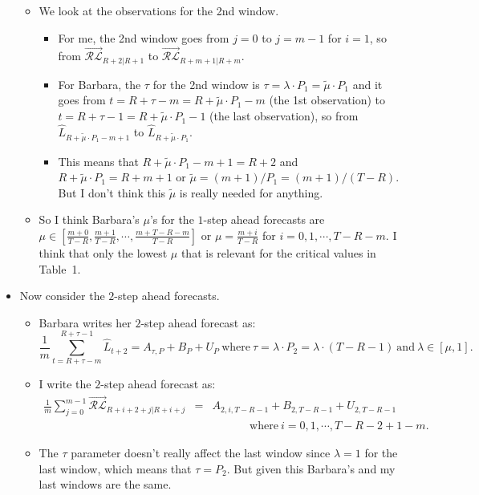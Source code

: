 \documentclass[11pt]{article}
\begin{document}
\begin{itemize}
\begin{itemize}
\item We look at the observations for the 2nd window. 
\begin{itemize}
\item For me, the 2nd window goes from $j=0$ to $j=m-1$ for $i=1$, so from
$\overrightarrow{\mathcal{RL}}_{R+2|R+1}$ to $\overrightarrow{\mathcal{RL}}_{R+m+1|R+m}$.
\item For Barbara, the $\tau$ for the 2nd window is $\tau=\lambda\cdot P_{1}=\widetilde{\mu}\cdot P_{1}$ and it goes from $t=R+\tau-m=R+\widetilde{\mu}\cdot P_{1}-m$ (the 1st observation) to $t=R+\tau-1=R+\widetilde{\mu}\cdot P_{1}-1$ (the last observation), so from $\widehat{L}_{R+\widetilde{\mu}\cdot P_{1}-m+1}$ to $\widehat{L}_{R+\widetilde{\mu}\cdot P_{1}}$.
\item This means that $R+\widetilde{\mu}\cdot P_{1}-m+1=R+2$ and $R+\widetilde{\mu}\cdot P_{1}=R+m+1$ or $\widetilde{\mu}=(m+1)/P_{1}=(m+1)/(T-R)$.  But I don't think this $\widetilde{\mu}$ is really needed for anything.
\end{itemize}
\item So I think Barbara's $\mu$'s for the $1$-step ahead forecasts are $\mu\in [\frac{m+0}{T-R},\frac{m+1}{T-R},\cdots,\frac{m+T-R-m}{T-R}]$ or $\mu=\frac{m+i}{T-R}$ for $i=0,1,\cdots,T-R-m$.  I think that only
the lowest $\mu$ that is relevant for the critical values in Table~1.
\end{itemize}
\item Now consider the $2$-step ahead forecasts.
\begin{itemize}
\item Barbara writes her $2$-step ahead forecast as: 
\[\frac{1}{m}\sum_{t=R+\tau-m}^{R+\tau-1}\widehat{L}_{t+2}=A_{\tau,P}\!+\!B_{P}\!+\!U_{P} \ \mathrm{where} \  \tau=\lambda\cdot P_{2}=\lambda\cdot(T-R-1) \ \mathrm{and} \  \lambda\in[\mu,1].\]
\item I write the $2$-step ahead forecast as: 
\begin{eqnarray}\frac{1}{m}\sum_{j=0}^{m-1}\overrightarrow{\mathcal{RL}}_{R+i+2+j|R+i+j}\!\!\!\!&=&\!\!\!\!A_{2,i,T-R-1}+B_{2,T-R-1}+U_{2,T-R-1} \nonumber \\
&&\ \ \ \ \   \ \ \ \ \   \ \ \ \ \   \mathrm{where}\  i=0,1,\cdots,T-R-2+1-m. \nonumber
\end{eqnarray}
\item The $\tau$ parameter doesn't really affect the last window since $\lambda=1$ for the last window, which means that $\tau=P_{2}$. But given this Barbara's and my last windows are the same.
\begin{itemize}

\end{itemize}
\end{itemize}
\end{itemize}
\end{document}
